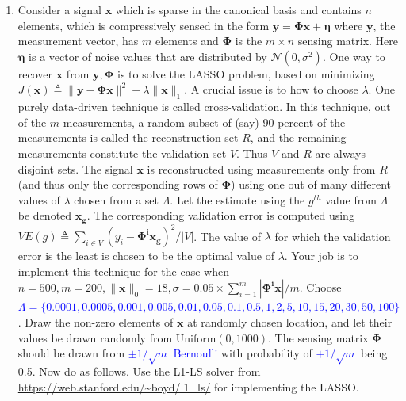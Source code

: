 \documentclass[11pt]{article}
\begin{document}
\maketitle
\begin{enumerate}
\item Consider a signal $\boldsymbol{x}$ which is sparse in the canonical basis and contains $n$ elements, which is compressively sensed in the form $\boldsymbol{y} = \boldsymbol{\Phi x} + \boldsymbol{\eta}$ where $\boldsymbol{y}$, the measurement vector, has $m$ elements and $\boldsymbol{\Phi}$ is the $m \times n$ sensing matrix. Here $\boldsymbol{\eta}$ is a vector of noise values that are distributed by $\mathcal{N}(0,\sigma^2)$.  One way to recover $\boldsymbol{x}$ from $\boldsymbol{y}, \boldsymbol{\Phi}$ is to solve the LASSO problem, based on minimizing $J(\boldsymbol{x}) \triangleq \|\boldsymbol{y}-\boldsymbol{\Phi x}\|^2 + \lambda \|\boldsymbol{x}\|_1$. A crucial issue is to how to choose $\lambda$. One purely data-driven technique is called cross-validation. In this technique, out of the $m$ measurements, a random subset of (say) 90 percent of the measurements is called the reconstruction set $R$, and the remaining measurements constitute the validation set $V$. Thus $V$ and $R$ are always disjoint sets. The signal $\boldsymbol{x}$ is reconstructed using measurements only from $R$ (and thus only the corresponding rows of $\boldsymbol{\Phi}$) using one out of many different values of $\lambda$ chosen from a set $\Lambda$. Let the estimate using the $g^{th}$ value from $\Lambda$ be denoted $\boldsymbol{x_g}$. The corresponding validation error is computed using $VE(g) \triangleq \sum_{i \in V} (y_i - \boldsymbol{\Phi^i x_g})^2/|V|$. The value of $\lambda$ for which the validation error is the least is chosen to be the optimal value of $\lambda$. Your job is to implement this technique for the case when $n = 500, m = 200, \|\boldsymbol{x}\|_0 = 18, \sigma = 0.05 \times \sum_{i=1}^m |\boldsymbol{\Phi^i x}| / m$. Choose \textcolor{blue}{$\Lambda = \{0.0001, 0.0005, 0.001, 0.005, 0.01, 0.05, 0.1, 0.5, 1, 2, 5, 10, 15, 20, 30, 50, 100\}$}. Draw the non-zero elements of $\boldsymbol{x}$ at randomly chosen location, and let their values be drawn randomly from $\textrm{Uniform}(0,1000)$. The sensing matrix $\boldsymbol{\Phi}$ should be drawn from \textcolor{blue}{$\pm 1/\sqrt{m} \textrm{ Bernoulli}$} with probability of \textcolor{blue}{$+1/\sqrt{m}$} being 0.5. Now do as follows. Use the L1-LS solver from \url{https://web.stanford.edu/~boyd/l1_ls/}  for implementing the LASSO. 


\end{enumerate}
\end{document}
